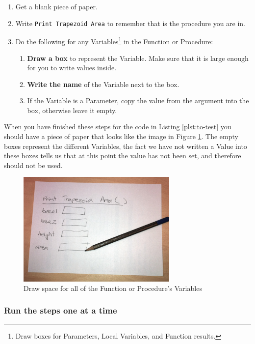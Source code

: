 \begin{enumerate}
  \item Get a blank piece of paper.
  \item Write \texttt{Print Trapezoid Area} to remember that is the procedure you are in.
  \item Do the following for any Variables\footnote{Draw boxes for Parameters, Local Variables, and Function results.} in the Function or Procedure:
  \begin{enumerate}
    \item \textbf{Draw a box} to represent the Variable. Make sure that it is large enough for you to write values inside.
    \item \textbf{Write the name} of the Variable next to the box.
    \item If the Variable is a Parameter, copy the value from the argument into the box, otherwise leave it empty.
  \end{enumerate}
\end{enumerate}

When you have finished these steps for the code in Listing \ref{plst:to-test} you should have a piece of paper that looks like the image in Figure \ref{fig:hand-exe-1}. The empty boxes represent the different Variables, the fact we have not written a Value into these boxes tells us that at this point the value has not been set, and therefore should not be used.

\begin{figure}[htbp]
   \centering
   \includegraphics[width=0.7\textwidth]{./topics/storing-using-data/images/hand-exe-1} 
   \caption{Draw space for all of the Function or Procedure's Variables}
   \label{fig:hand-exe-1}
\end{figure}


\clearpage
\subsubsection{Run the steps one at a time} %
\label{ssub:run_the_steps_one_at_a_time}

